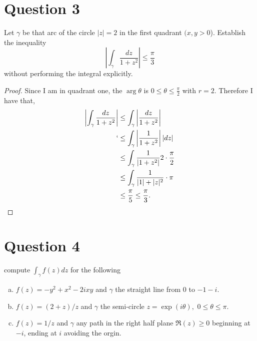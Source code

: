 \documentclass[10pt,two side,openright]{article}
\newcommand{\8}{\bar}
\newcommand{\f}{\frac}
\begin{document}
\section{Question 3} 
Let $\gamma$ be that arc of the circle $|z| = 2$ in the first quadrant $(x,y > 0$). \newline 
Establish the inequality 
\[ \left| \int_{\gamma} \f{dz}{1+z^{2}} \right| \leq \f{\pi}{3} \]
without performing the integral explicitly. 
\begin{proof}
Since I am in quadrant one, the $\arg\theta$ is $0 \leq \theta \leq \f{\pi}{2}$ with $r = 2.$ Therefore I have that,
\begin{align*}
\left|\int_{\gamma} \f{dz}{1+z^{2}} \right| &\leq \int_{\gamma}\left|\f{dz}{1+ z^{2}} \right| \\
`							    &\leq \int_{\gamma}\left|\f{1}{1+z^{2}}\right||dz| \\ 
							    &\leq \int_{\gamma}\f{1}{|1+z^{2}|}2 \cdot \f{\pi}{2} \\ 
							    &\leq \int_{\gamma} \f{1}{|1| + |z|^{2}} \cdot \pi \\
							    &\leq \f{\pi}{5} \leq \f{\pi}{3}. 
\end{align*}

\end{proof}
\section{Question 4} 
compute $\int_{\gamma} f(z) dz$ for the following 
\begin{enumerate}[(a)] 
\item $f(z) = -y^{2} + x^{2} -2ixy$ and $\gamma$ the straight line from $0$ to $-1-i.$ 
\item $f(z) = (2+z)/z$ and $\gamma$ the semi-circle $z = \exp(i\theta),$ $0 \leq \theta \leq \pi$. 
\item $f(z) = 1/z$ and $\gamma$ any path in the right half plane $\Re(z) \geq 0$ beginning at $-i$, ending at $i$ avoiding the orgin. 
\end{enumerate} 
\end{document}
